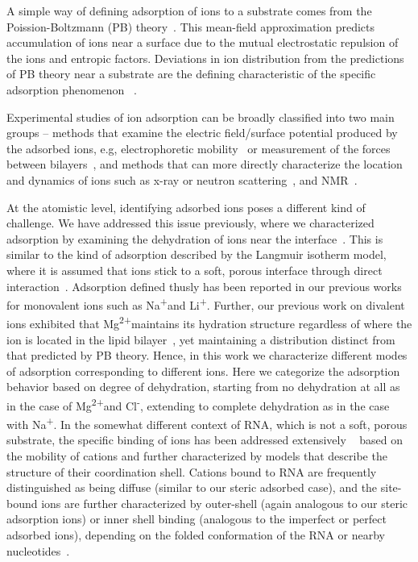 \documentclass[12pt,openany,final]{book}
\newcommand{\na}{Na\textsuperscript{+}}
\newcommand{\li}{Li\textsuperscript{+}}
\newcommand{\mg}{Mg\textsuperscript{2+}}
\begin{document}
A simple way of defining adsorption of ions to a substrate 
comes from the Poission-Boltzmann (PB) theory~\cite{israelachvili:2011:intermol}.
{This mean-field approximation predicts accumulation
of ions near a surface due to the mutual electrostatic repulsion
of the ions and entropic factors.}
{Deviations in ion distribution from the predictions of PB theory near a substrate are
    the defining characteristic of the specific adsorption phenomenon
~\cite{stern:1924:theory,grahame:1947:electrical}.}

Experimental studies of ion adsorption can be broadly
classified into two main groups -- methods that examine the electric field/surface potential
produced by the adsorbed ions, e.g, electrophoretic mobility~\cite{smith:2017:zeta} or 
measurement of the forces between 
bilayers~\cite{marra:1985:direct}, and methods
that can more directly characterize the location and dynamics of ions such 
as x-ray or neutron 
scattering~\cite{fogarty:2015,nagle:2000,pan:2012,panff:2012,uhrikova:2008,mason:2006:neutron}, and
NMR~\cite{nagle:2000,venable:2013,casal:1989}. 

At the atomistic level, identifying adsorbed ions poses a different kind of challenge.
We have addressed this issue previously,
where we characterized adsorption by examining the dehydration of ions near the
interface~\cite{kruczek:2019,kruczek:2017,pandit:2003:dppc:na,Berkowitz:2006}.
This is similar to the kind of adsorption described 
by the Langmuir isotherm model, where it is
assumed that ions stick to a soft, porous interface 
through direct interaction~\cite{kalinin:1996:ionbinding}.
Adsorption defined thusly has been reported in our previous works for monovalent ions 
such as \na and {\li}\cite{kruczek:2017,kruczek:2019,saunders:2019,saunders:2022}.
Further, our previous work on divalent ions
exhibited that \mg maintains its 
hydration {structure} regardless of where the ion is located in the 
lipid bilayer~\cite{kruczek:2019}, yet maintaining 
a distribution distinct from that
predicted by PB theory. Hence, {in this work
    we characterize different modes of adsorption corresponding
to different ions. Here we} categorize the 
adsorption behavior based on degree of 
dehydration, starting from no
dehydration at all as in the case of \mg and Cl\textsuperscript{-}, 
extending to complete dehydration as in the case with Na\textsuperscript{+}. 
In {the somewhat different} 
context of RNA, which is not a soft, 
porous substrate, the specific binding of ions has been addressed
extensively
~\cite{bowman:2012,rulivsek:2003:outer,dudev:2003,porschke:1979:mode,petrov:2005}
based on the mobility of cations and further 
characterized by models that describe the 
structure of their coordination shell.
Cations bound to RNA are frequently distinguished as
being diffuse {(similar to our steric adsorbed case)}, and the site-bound ions are further characterized
by outer-shell {(again analogous to our steric adsorption ions)} 
or inner shell binding 
{(analogous to the imperfect or perfect adsorbed ions)}, depending on
the folded conformation of the RNA or 
nearby nucleotides~\cite{bowman:2012,rulivsek:2003:outer,dudev:2003,porschke:1979:mode,petrov:2005}. 
\end{document}
